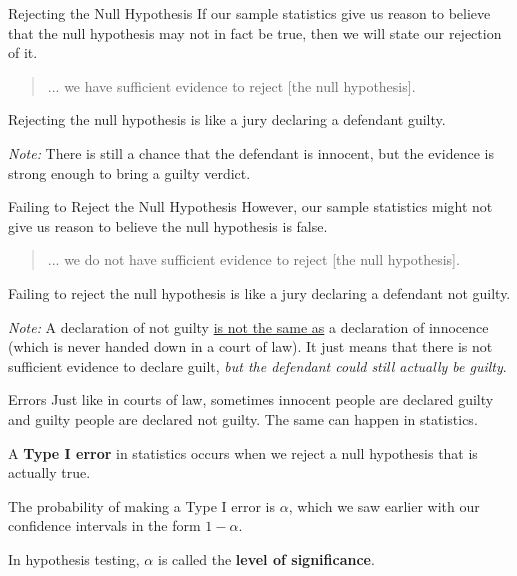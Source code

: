 \documentclass[t]{beamer}
\begin{document}
\begin{frame}{Rejecting the Null Hypothesis}
If our sample statistics give us reason to believe that the null hypothesis may not in fact be true, then we will state our rejection of it.	\newline\\	\pause

\begin{quote}
... we have sufficient evidence to reject [the null hypothesis].
\end{quote}	\bigskip		\pause

Rejecting the null hypothesis is like a jury declaring a defendant guilty. \newline\\	\pause

\emph{Note:} There is still a chance that the defendant is innocent, but the evidence is strong enough to bring a guilty verdict.
\end{frame}

\begin{frame}{Failing to Reject the Null Hypothesis}
However, our sample statistics might not give us reason to believe the null hypothesis is false. \newline\\	\pause

\begin{quote}
... we do not have sufficient evidence to reject [the null hypothesis].
\end{quote}	\bigskip \pause

Failing to reject the null hypothesis is like a jury declaring a defendant not guilty.	\newline\\	\pause

\emph{Note:} A declaration of not guilty \underline{is not the same as} a declaration of innocence (which is never handed down in a court of law). It just means that there is not sufficient evidence to declare guilt, \emph{but the defendant could still actually be guilty}.
\end{frame}

\begin{frame}{Errors}
Just like in courts of law, sometimes innocent people are declared guilty and guilty people are declared not guilty. The same can happen in statistics.	\newline\\	\pause

\begin{tcolorbox}[colframe=green!20!black, colback = green!30!white,title={\textbf{Type I Error}}]
A \textbf{Type I error} in statistics occurs when we reject a null hypothesis that is actually true.
\end{tcolorbox}
\bigskip \pause

The probability of making a Type I error is $\alpha$, which we saw earlier with our confidence intervals in the form $1-\alpha$.	\newline\\	\pause

In hypothesis testing, $\alpha$ is called the \textbf{level of significance}.
\end{frame}
\end{document}
